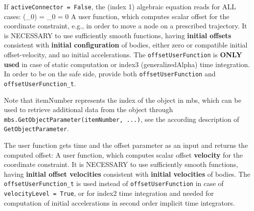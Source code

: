     If \texttt{activeConnector = False}, the (index 1) algebraic equation reads for ALL cases:
    \be
      \cv(\lambda_0) = \lambda_0 = 0
    \ee
    A user function, which computes scalar offset for the coordinate constraint, e.g., in order to move a node on a prescribed trajectory.
    It is NECESSARY to use sufficiently smooth functions, having {\bf initial offsets} consistent with {\bf initial configuration} of bodies, 
    either zero or compatible initial offset-velocity, and no initial accelerations.
    The \texttt{offsetUserFunction} is {\bf ONLY used} in case of static computation or index3 (generalizedAlpha) time integration.
    In order to be on the safe side, provide both  \texttt{offsetUserFunction} and  \texttt{offsetUserFunction\_t}.

    Note that itemNumber represents the index of the object in mbs, which can be used to retrieve additional data from the object through
    \texttt{mbs.GetObjectParameter(itemNumber, ...)}, see the according description of \texttt{GetObjectParameter}.

    The user function gets time and the offset parameter as an input and returns the computed offset:
    \finishTable
    A user function, which computes scalar offset {\bf velocity} for the coordinate constraint.
    It is NECESSARY to use sufficiently smooth functions, having {\bf initial offset velocities} consistent with {\bf initial velocities} of bodies.
    The \texttt{offsetUserFunction\_t} is used instead of \texttt{offsetUserFunction} in case of \texttt{velocityLevel = True}, 
    or for index2 time integration and needed for computation of initial accelerations in second order implicit time integrators.

